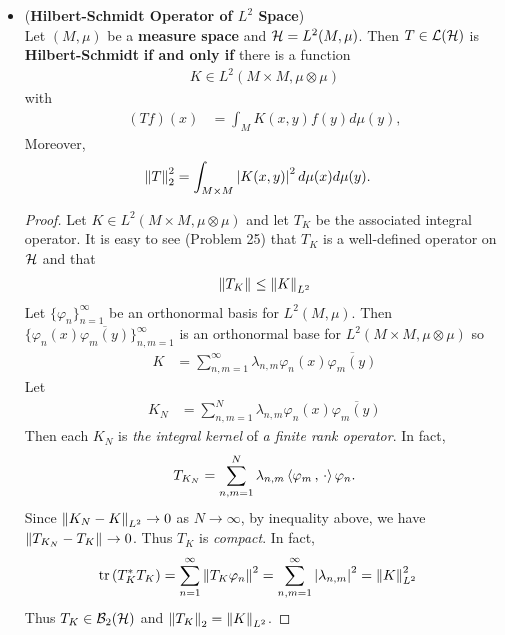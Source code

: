 \documentclass[11pt]{article}
\begin{document}
\begin{itemize}
\item \begin{theorem} (\textbf{Hilbert-Schmidt Operator of $L^2$ Space}) \citep{reed1980methods}\\
Let $(M, \mu)$ be a \textbf{measure space} and  ${\mathcal H} = L^2(M, \mu)$.  Then $T \in {\mathcal L}({\mathcal H})$ is \textbf{Hilbert-Schmidt} \textbf{if and only if} there is a function 
\begin{align*}
K \in L^2(M \times M, \mu \otimes \mu)
\end{align*}
with 
\begin{align*}
(T f)(x) &= \int_{M} K(x, y)f(y) d\mu(y),
\end{align*}
Moreover, 
\begin{align*}
\left\|T\right\|_{2}^2 &= \int_{M \times M} \left\lvert K(x, y) \right\rvert^2 d\mu(x) d\mu(y).
\end{align*}
\end{theorem}
\begin{proof}
Let $K \in L^2(M \times M, \mu \otimes \mu)$ and let $T_K$ be the associated integral operator. It is easy to see (Problem 25) that $T_K$ is a well-defined operator on ${\mathcal H}$ and that 
\begin{align*}
\left\|T_K\right\|_{} \le \left\|K\right\|_{L^2}
\end{align*} 
Let $\{\varphi_n\}_{n=1}^{\infty}$ be an orthonormal basis for $L^2(M, \mu)$. Then $\{\varphi_n(x)\overline{\varphi_m(y)}\}_{n,m=1}^{\infty}$ 
is an orthonormal base for $L^2(M \times M, \mu \otimes \mu)$ so 
\begin{align*}
K &= \sum_{n,m=1}^{\infty}\lambda_{n,m}\varphi_n(x)\overline{\varphi_m(y)}
\end{align*}
Let 
\begin{align*}
K_N &= \sum_{n,m=1}^{N}\lambda_{n,m}\varphi_n(x)\overline{\varphi_m(y)}
\end{align*}
Then each $K_N$ is \emph{the integral kernel} of \emph{a finite rank operator}. In fact,
\begin{align*}
T_{K_N} = \sum_{n,m=1}^{N}\lambda_{n,m}\left\langle \varphi_m\,,\, \cdot \right\rangle\varphi_n.
\end{align*} Since $\left\|K_N - K\right\|_{L^2} \rightarrow 0$ as $N \rightarrow \infty$, by inequality above, we have $\left\|T_{K_N} - T_K\right\|_{} \rightarrow 0$. Thus $T_K$ is \emph{compact}. In fact, 
\begin{align*}
\mathrm{tr}\left(T_K^{*}T_K \right) &= \sum_{n=1}^{\infty}\left\|T_K \varphi_n\right\|_{}^2 = \sum_{n,m=1}^{\infty}\left\lvert \lambda_{n,m} \right\rvert^2 = \left\|K\right\|_{L^2}^2
\end{align*}
Thus $T_K \in {\mathcal B}_2({\mathcal H})$ and $\left\|T_K\right\|_{2} = \left\|K\right\|_{L^2}$.


\end{proof}
\end{itemize}
\end{document}
